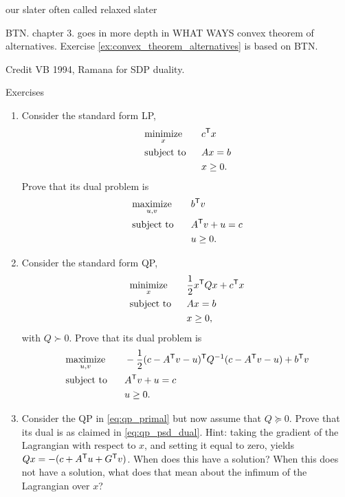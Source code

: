 our slater often called relaxed slater

BTN. chapter 3. goes in more depth in WHAT WAYS
convex theorem of alternatives. Exercise
\ref{ex:convex_theorem_alternatives} is based on BTN. 

Credit VB 1994, Ramana for SDP duality. 

\clearpage

\begin{xcb}{Exercises}
\begin{enumerate}[label=\thechapter.\arabic*]
\settowidth{\leftmargini}{0.00.\hskip\labelsep}
\item \label{ex:lp_std_dual}
  Consider the standard form LP,
  \begin{alignat*}{2}
  &\operatorname*{minimize}_x \quad && c^{\mathsf{T}} x \\
  &\operatorname{subject\,\,to} && Ax = b \\
  & && x \geq 0.
  \end{alignat*}
  Prove that its dual problem is 
  \begin{alignat*}{2}
  &\operatorname*{maximize}_{u,v} \quad && b^{\mathsf{T}} v \\
  &\operatorname{subject\,\,to} && A^{\mathsf{T}} v + u = c \\
  & && u \geq 0.
  \end{alignat*}

\item \label{ex:qp_std_dual} 
  Consider the standard form QP,
  \begin{alignat*}{2}
  &\operatorname*{minimize}_x \quad && \frac{1}{2} x^{\mathsf{T}} Q x + c^{\mathsf{T}} x \\
  &\operatorname{subject\,\,to} && Ax = b \\
  & && x \geq 0,
  \end{alignat*}
  with $Q \succ 0$. Prove that its dual problem is
  \begin{alignat*}{2}
  &\operatorname*{maximize}_{u,v} \quad && -\frac{1}{2} (c - A^{\mathsf{T}} v - u)^{\mathsf{T}} Q^{-1} (c - A^{\mathsf{T}} v
  - u) + b^{\mathsf{T}} v \\
  &\operatorname{subject\,\,to} && A^{\mathsf{T}} v + u = c \\
  & && u \geq 0.
  \end{alignat*}

\item \label{ex:qp_psd_dual} 
  Consider the QP in \eqref{eq:qp_primal} but now assume that $Q \succeq
  0$. Prove that its dual is as claimed in \eqref{eq:qp_psd_dual}. Hint: taking
  the gradient of the Lagrangian with respect to $x$, and setting it equal to
  zero, yields $Qx = -(c + A^{\mathsf{T}} u + G^{\mathsf{T}} v)$. When does this have a solution?
  When this does not have a solution, what does that mean about the infimum of 
  the Lagrangian over $x$?   


\end{enumerate}
\end{xcb}
